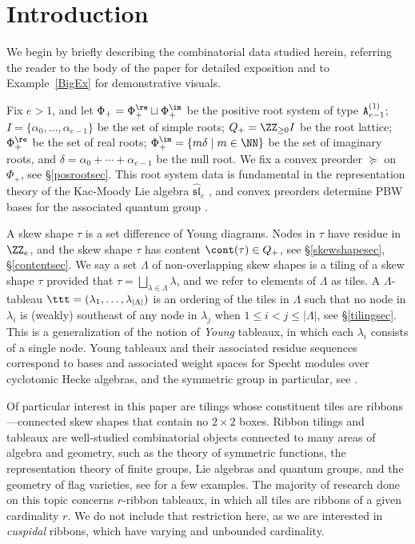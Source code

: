 \section{Introduction}

We begin by briefly describing the combinatorial data studied herein, referring the reader to the body of the paper for detailed exposition and to Example~\ref{BigEx} for demonstrative visuals.

Fix \(e > 1\), and let \(\Phi_+ = \Phi_+^\re \sqcup \Phi_+^\im\) be the positive root system of type \({\tt A}^{(1)}_{e-1}\); \(I = \{\alpha_0, \ldots, \alpha_{e-1}\}\) be the set of simple roots; \(Q_+ = \ZZ_{\geq 0}I\) be the root lattice;  \(\Phi_+^\re\) be the set of real roots; \(\Phi_+^\im = \{m \delta \mid m \in \NN\}\) be the set of imaginary roots, and \(\delta = \alpha_0 + \cdots + \alpha_{e-1}\) be the null root. We fix a convex preorder \(\succeq\) on \(\Phi_+\), see \S\ref{posrootsec}. This root system data is fundamental in the representation theory of the Kac-Moody Lie algebra \(\widehat{\mathfrak{sl}}_e\) \cite{KacBookInfLie}, and convex preorders determine PBW bases for the associated quantum group \cite{BeckConBas}.


A skew shape \(\tau\) is a set difference of Young diagrams. Nodes in \(\tau\) have residue in \(\ZZ_e\), and the skew shape \(\tau\) has content \(\cont(\tau) \in Q_+\), see \S\ref{skewshapesec}, \S\ref{contentsec}.
We say a set \(\Lambda\) of non-overlapping skew shapes is a tiling of a skew shape \(\tau\) provided that \(\tau = \bigsqcup_{\lambda \in \Lambda}\lambda\), and we refer to elements of \(\Lambda\) as tiles. A \(\Lambda\)-tableau \(\ttt = (\lambda_1, \ldots, \lambda_{|\Lambda|})\)  is an ordering of the tiles in \(\Lambda\) such that no node in \(\lambda_i\) is (weakly) southeast of any node in \(\lambda_j\) when \(1 \leq i < j \leq |\Lambda|\), see \S\ref{tilingsec}. This is a generalization of the notion of {\em Young} tableaux, in which each \(\lambda_i\) consists of a single node. Young tableaux and their associated residue sequences correspond to bases and associated weight spaces for Specht modules over cyclotomic Hecke algebras, and the symmetric group in particular, see \cite{MathasBookHecke, KlBookLinProj}.

Of particular interest in this paper are tilings whose constituent tiles are ribbons---connected skew shapes that contain no \(2 \times 2\) boxes.
Ribbon tilings and tableaux are well-studied combinatorial objects connected to many areas of algebra and geometry, such as the theory of symmetric functions, the representation theory of finite groups, Lie algebras and quantum groups, and the geometry of flag varieties, see \cite{FoStRimHk, LLTRibbon, ShefRib} for a few examples. The majority of research done on this topic concerns \(r\)-ribbon tableaux, in which all tiles are ribbons of a given cardinality \(r\). We do not include that restriction here, as we are interested in {\em cuspidal} ribbons, which have varying and unbounded cardinality.


